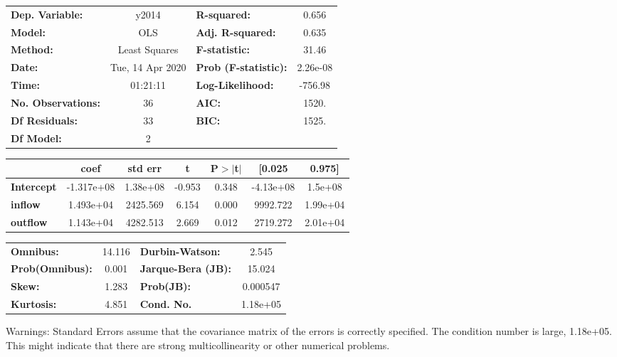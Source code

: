 \begin{center}
\begin{tabular}{lclc}
\toprule
\textbf{Dep. Variable:}    &      y2014       & \textbf{  R-squared:         } &     0.656   \\
\textbf{Model:}            &       OLS        & \textbf{  Adj. R-squared:    } &     0.635   \\
\textbf{Method:}           &  Least Squares   & \textbf{  F-statistic:       } &     31.46   \\
\textbf{Date:}             & Tue, 14 Apr 2020 & \textbf{  Prob (F-statistic):} &  2.26e-08   \\
\textbf{Time:}             &     01:21:11     & \textbf{  Log-Likelihood:    } &   -756.98   \\
\textbf{No. Observations:} &          36      & \textbf{  AIC:               } &     1520.   \\
\textbf{Df Residuals:}     &          33      & \textbf{  BIC:               } &     1525.   \\
\textbf{Df Model:}         &           2      & \textbf{                     } &             \\
\bottomrule
\end{tabular}
\begin{tabular}{lcccccc}
                   & \textbf{coef} & \textbf{std err} & \textbf{t} & \textbf{P$> |$t$|$} & \textbf{[0.025} & \textbf{0.975]}  \\
\midrule
\textbf{Intercept} &   -1.317e+08  &     1.38e+08     &    -0.953  &         0.348        &    -4.13e+08    &      1.5e+08     \\
\textbf{inflow}    &    1.493e+04  &     2425.569     &     6.154  &         0.000        &     9992.722    &     1.99e+04     \\
\textbf{outflow}   &    1.143e+04  &     4282.513     &     2.669  &         0.012        &     2719.272    &     2.01e+04     \\
\bottomrule
\end{tabular}
\begin{tabular}{lclc}
\textbf{Omnibus:}       & 14.116 & \textbf{  Durbin-Watson:     } &    2.545  \\
\textbf{Prob(Omnibus):} &  0.001 & \textbf{  Jarque-Bera (JB):  } &   15.024  \\
\textbf{Skew:}          &  1.283 & \textbf{  Prob(JB):          } & 0.000547  \\
\textbf{Kurtosis:}      &  4.851 & \textbf{  Cond. No.          } & 1.18e+05  \\
\bottomrule
\end{tabular}
\end{center}

Warnings: \newline
 [1] Standard Errors assume that the covariance matrix of the errors is correctly specified. \newline
 [2] The condition number is large, 1.18e+05. This might indicate that there are \newline
 strong multicollinearity or other numerical problems.